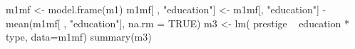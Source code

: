 \begin{Schunk}
\begin{Sinput}
 m1mf <- model.frame(m1)
 m1mf[ , "education"] <- m1mf[, "education"] - mean(m1mf[ , "education"], na.rm = TRUE) 
 m3 <- lm( prestige ~ education * type, data=m1mf)
 summary(m3)
\end{Sinput}
\end{Schunk}

